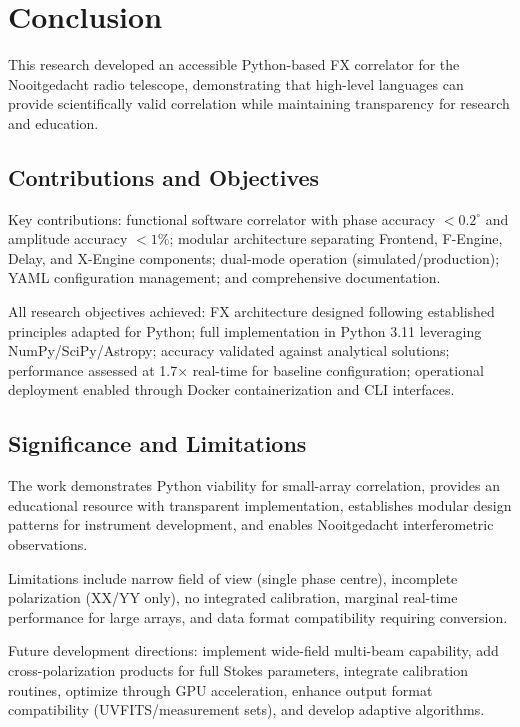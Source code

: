 \chapter{Conclusion}

This research developed an accessible Python-based FX correlator for the Nooitgedacht radio telescope, demonstrating that high-level languages can provide scientifically valid correlation while maintaining transparency for research and education.

\section{Contributions and Objectives}

Key contributions: functional software correlator with phase accuracy $< 0.2^\circ$ and amplitude accuracy $< 1\%$; modular architecture separating Frontend, F-Engine, Delay, and X-Engine components; dual-mode operation (simulated/production); YAML configuration management; and comprehensive documentation.

All research objectives achieved: FX architecture designed following established principles adapted for Python; full implementation in Python 3.11 leveraging NumPy/SciPy/Astropy; accuracy validated against analytical solutions; performance assessed at 1.7$\times$ real-time for baseline configuration; operational deployment enabled through Docker containerization and CLI interfaces.

\section{Significance and Limitations}

The work demonstrates Python viability for small-array correlation, provides an educational resource with transparent implementation, establishes modular design patterns for instrument development, and enables Nooitgedacht interferometric observations.

Limitations include narrow field of view (single phase centre), incomplete polarization (XX/YY only), no integrated calibration, marginal real-time performance for large arrays, and data format compatibility requiring conversion.

Future development directions: implement wide-field multi-beam capability, add cross-polarization products for full Stokes parameters, integrate calibration routines, optimize through GPU acceleration, enhance output format compatibility (UVFITS/measurement sets), and develop adaptive algorithms.

